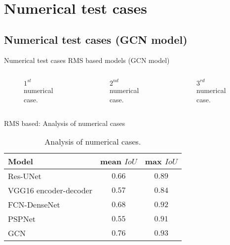 \documentclass[10pt,aspectratio=169,dvipsnames]{beamer} %
\begin{document}
		\section{Numerical test cases}
		\subsection{Numerical test cases (GCN model)}
		\begin{frame}{Numerical test cases RMS based models (GCN model)}
			\begin{columns}[T]
				\begin{column}[c]{0.32\textwidth}
					\begin{figure}[c]
						\centering
						\caption{\(1^{st}\) numerical case.}
					\end{figure}
				\end{column}
				\hfill
				\begin{column}[c]{0.32\textwidth}
					\begin{figure}[c]
						\centering
						\caption{\(2^{nd}\) numerical case.}
					\end{figure}
				\end{column}
				\hfill
				\begin{column}[c]{0.32\textwidth}
					\begin{figure}[c]
						\centering
						\caption{\(3^{rd}\) numerical case.}
					\end{figure}
				\end{column}
			\end{columns}
		\end{frame}
		\begin{frame}{RMS based: Analysis of numerical cases}
			\begin{table}[ht!]
				\centering
				\caption{Analysis of numerical cases.}
				\label{tab:table_all_numerical_cases}	
				\begin{tabular}{lcc}
					\toprule
					Model & mean \(IoU\) & max \(IoU\) \\ 
					\midrule 
					Res-UNet & \(0.66\) & \(0.89\) \\ 
					VGG16 encoder-decoder & \(0.57\) & \(0.84\) \\ 
					FCN-DenseNet & \(0.68\) & \(0.92\) \\ 
					PSPNet & \(0.55\) & \(0.91\) \\ 
					GCN & \(0.76\) & \(0.93\) \\ 
					\bottomrule
				\end{tabular}
			\end{table}
		\end{frame}
\end{document}
